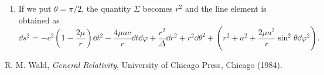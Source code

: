 \documentclass[a4paper,pdftex,10pt]{article}
\begin{document}
\maketitle

\begin{enumerate}
  \item
  If we put $\theta=\pi/2$, the quantity $\Sigma$ becomes $r^2$ and the line element is obtained as
  \begin{equation}
    \dd s^2
    =
    -
    c^2
    \left( 1-\frac{2\mu}{r} \right)\dd t^2
    -
    \frac{4\mu ac}{r}\dd t\dd \varphi
    +
    \frac{r^2}{\Delta}\dd r^2
    +
    r^2\dd \theta^2
    +
    \left(  
      r^2+a^2+\frac{2\mu a^2}{r}\sin^2\theta\dd\varphi^2
    \right)
    .
  \end{equation}




\end{enumerate}

\clearpage
\begin{thebibliography}{99}
  R. M. Wald, \textit{General Relativity}, University of Chicago Press, Chicago (1984).
\end{thebibliography}












% 
% 

\end{document}
